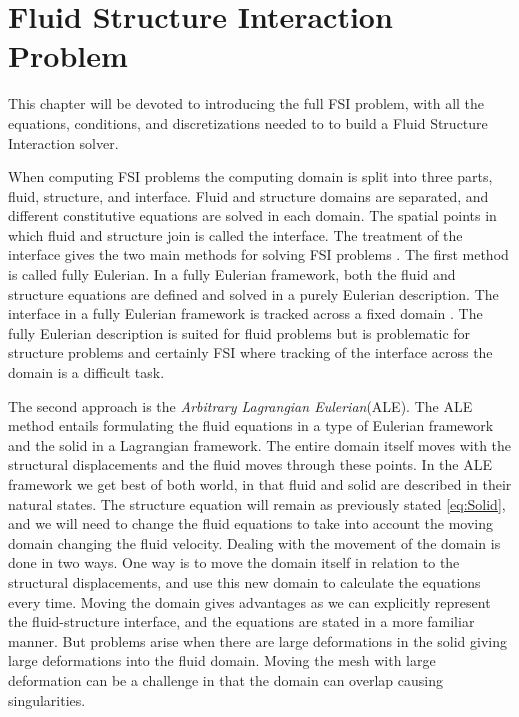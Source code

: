 \chapter{Fluid Structure Interaction Problem}
This chapter will be devoted to introducing the full FSI problem, with all the equations, conditions, and discretizations needed to to build a Fluid Structure Interaction solver. \newline

When computing FSI problems the computing domain is split into three parts, fluid, structure, and interface. Fluid and structure domains are separated, and different constitutive equations are solved in each domain. The spatial points in which fluid and structure join is called the interface. The treatment of the interface gives the two main methods for solving FSI problems \cite{Liu2014}. The first method is called fully Eulerian. In a fully Eulerian framework, both the fluid and structure equations are defined and solved in a purely Eulerian description. The interface in a fully Eulerian framework is tracked across a fixed domain \cite{Valkov2015}. The fully Eulerian description is suited for fluid problems but is problematic for structure problems and certainly FSI where tracking of the interface across the domain is a difficult task. \newline

The second approach is the \textit{Arbitrary Lagrangian Eulerian}(ALE).
The ALE method entails formulating the fluid equations in a type of Eulerian framework and the solid in a Lagrangian framework. The entire domain itself moves with the structural displacements and the fluid moves through these points. In the ALE framework we get best of both world, in that fluid and solid are described in their natural states. The structure equation will remain as previously stated \eqref{eq:Solid}, and we will need to change the fluid equations to take into account the moving domain changing the fluid velocity. Dealing with the movement of the domain is done in two ways. One way is to move the domain itself in relation to the structural displacements, and use this new domain to calculate the equations every time.
Moving the domain gives advantages as we can explicitly represent the fluid-structure interface, and the equations are stated in a more familiar manner. But problems arise when there are large deformations in the solid giving large deformations into the fluid domain. Moving the mesh with large deformation can be a challenge in that the domain can overlap causing singularities. \newline

